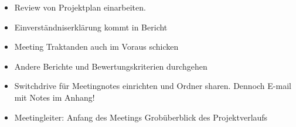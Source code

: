 \begin{itemize}

\item
  Review von Projektplan einarbeiten.
\item
  Einverständniserklärung kommt in Bericht
\item
  Meeting Traktanden auch im Voraus schicken
\item
  Andere Berichte und Bewertungskriterien durchgehen
\item
  Switchdrive für Meetingnotes einrichten und Ordner sharen. Dennoch
  E-mail mit Notes im Anhang!
\item
  Meetingleiter: Anfang des Meetings Grobüberblick des Projektverlaufs
\end{itemize}